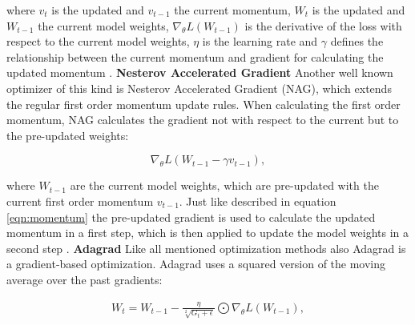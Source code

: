 where $v_{t}$ is the updated and $v_{t-1}$ the current momentum, $W_{t}$ is the updated and $W_{t-1}$ the current model weights, $\nabla_{\theta}L(W_{t-1})$ is the derivative of the loss with respect to the current model weights, $\eta$ is the learning rate and $\gamma$ defines the relationship between the current momentum and gradient for calculating the updated momentum \cite{Ruder2016}.
\newline
\newline
\textbf{Nesterov Accelerated Gradient}
\newline
Another well known optimizer of this kind is Nesterov Accelerated Gradient (NAG), which extends the regular first order momentum update rules. When calculating the first order momentum, NAG calculates the gradient not with respect to the current but to the pre-updated weights: 

\begin{equation}
    \nabla_{\theta}L( W_{t-1} - \gamma v_{t-1}),
\end{equation}

where $W_{t-1}$ are the current model weights, which are pre-updated with the current first order momentum $v_{t-1}$. Just like described in equation \ref{eqn:momentum} the pre-updated gradient is used to calculate the updated momentum in a first step, which is then applied to update the model weights in a second step \cite{Ruder2016}.
\newline
\newline
\textbf{Adagrad}
\newline
Like all mentioned optimization methods also Adagrad is a gradient-based optimization. Adagrad uses a squared version of the moving average over the past gradients:

\begin{equation}
  \begin{aligned}
  W_{t} = W_{t-1} - \frac{\eta}{\sqrt[2]{G_{t}+ \epsilon}} \bigodot \nabla_{\theta}L(W_{t-1}),
  \end{aligned}
  \label{eq:Adagrad}
\end{equation}

